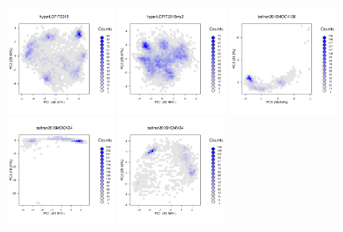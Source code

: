 \documentclass[12pt]{article}\usepackage[]{graphicx}\usepackage[]{color}
\begin{document}
\begin{appendices}
\begin{figure}[htb]
  \includegraphics[width = 0.32\textwidth]{./figure/fighexpca-5.pdf}
  \includegraphics[width = 0.32\textwidth]{./figure/fighexpca-6.pdf}
  \includegraphics[width = 0.32\textwidth]{./figure/fighexpca-7.pdf}
  \includegraphics[width = 0.32\textwidth]{./figure/fighexpca-8.pdf}
  \includegraphics[width = 0.32\textwidth]{./figure/fighexpca-9.pdf}
\end{figure}

\end{appendices}
\end{document}
